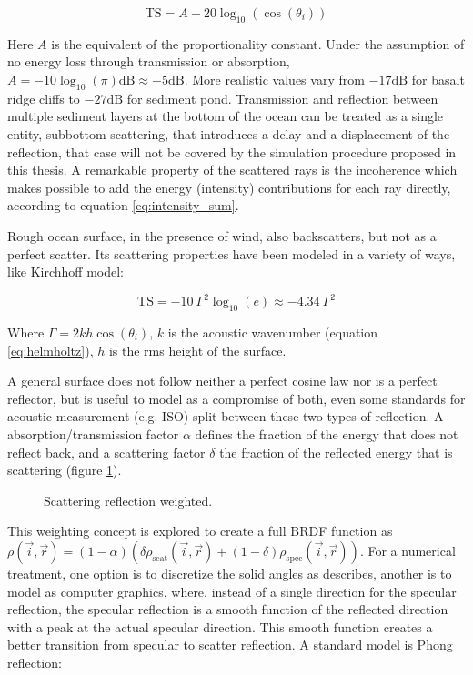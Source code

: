 \begin{equation*}
\text{TS} = A + 20\log_{10}(\cos(\theta_i))
\end{equation*}

Here $A$ is the equivalent of the proportionality constant. Under the assumption
of no energy loss through transmission or absorption,
$A=-10\log_{10}(\pi)\text{dB} \approx -5\text{dB}$. More realistic values vary
from $-17\text{dB}$ for basalt ridge cliffs to $-27\text{dB}$ for sediment
pond\cite{dunn2015springer}.
Transmission and reflection between multiple sediment layers at the bottom of
the ocean can be treated as a single entity, subbottom scattering, that introduces a
delay and a displacement of the reflection\cite{Etter2013}, that case will not
be covered by the simulation procedure proposed in this thesis. A remarkable
property of the scattered rays is the incoherence which makes possible to add
the energy (intensity) contributions for each ray directly, according to
equation \ref{eq:intensity_sum}.

Rough ocean surface, in the presence of wind, also backscatters, but not as a
perfect scatter. Its scattering properties have been modeled in a variety of
ways\cite{jones2009modelling}, like Kirchhoff model\cite{dunn2015springer}:

\begin{equation*}
\text{TS} = -10~\Gamma^2\log_{10}(e) \approx -4.34~\Gamma^2
\end{equation*}

Where $\Gamma = 2kh\cos(\theta_i)$, $k$ is the acoustic wavenumber (equation
\ref{eq:helmholtz}), $h$ is the rms height of the surface.

A general surface does not follow neither a perfect cosine law nor is a perfect
reflector, but is useful to model as a compromise of
both\cite{cox2006tutorial,vorlander2000definition}, even some standards for
acoustic measurement (e.g. ISO) split between these two types of
reflection\cite{rindel2001scattering}. A absorption/transmission factor $\alpha$
defines the fraction of the energy that does not reflect back, and a scattering
factor $\delta$ the fraction of the reflected energy that is scattering (figure
\ref{fig:scatter}).

\begin{figure}[h]
	\centering
	
	\caption{Scattering reflection weighted.}
	\label{fig:scatter}
\end{figure}

This weighting concept is explored to create a full BRDF function as
$\rho(\vec{i},\vec{r}) = (1-\alpha)(\delta \rho_\text{scat}(\vec{i},\vec{r}) +
(1-\delta) \rho_\text{spec}(\vec{i},\vec{r}) )$. For a numerical treatment, one
option is to discretize the solid angles as \citet{siltanen2007room} describes,
another is to model as computer graphics, where, instead of a single direction
for the specular reflection, the specular reflection is a smooth function of the
reflected direction with a peak at the actual specular direction. This smooth
function creates a better transition from specular to scatter reflection. A
standard model is Phong reflection\cite{phong1975illumination}:

